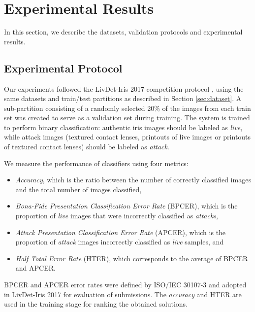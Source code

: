 \section{Experimental Results}
\label{sec:experimental_results}

In this section, we describe the datasets, validation protocols and experimental results. 



\subsection{Experimental Protocol}
\label{sec:experimental_protocol}

Our experiments followed the LivDet-Iris 2017 competition protocol \cite{livdet2017}, using the same datasets and train/test partitions as described in Section \ref{sec:dataset}. A sub-partition consisting of a randomly selected 20\% of the images from each train set was created to serve as a validation set during training. The system is trained to perform binary classification: authentic iris images should be labeled as \emph{live}, while attack images (textured contact lenses, printouts of live images or printouts of textured contact lenses) should be labeled as \emph{attack}.

We measure the performance of classifiers using four metrics: 

\begin{itemize}
    \item \emph{Accuracy}, which is the ratio between the number of correctly classified images and the total number of images classified,
    \item \emph{Bona-Fide Presentation Classification Error Rate} (BPCER), which is the proportion of \emph{live} images that were incorrectly classified as \emph{attacks},  
    \item \emph{Attack Presentation Classification Error Rate} (APCER), which is the proportion of \emph{attack} images incorrectly classified as \emph{live} samples, and
    \item \emph{Half Total Error Rate} (HTER), which corresponds to the average of BPCER and APCER.
\end{itemize}

BPCER and APCER error rates were defined by ISO/IEC 30107-3 \cite{ISO_30107-3_2017} and adopted in LivDet-Iris 2017 for evaluation of submissions. The \emph{accuracy} and HTER are used in the training stage for ranking the obtained solutions.

